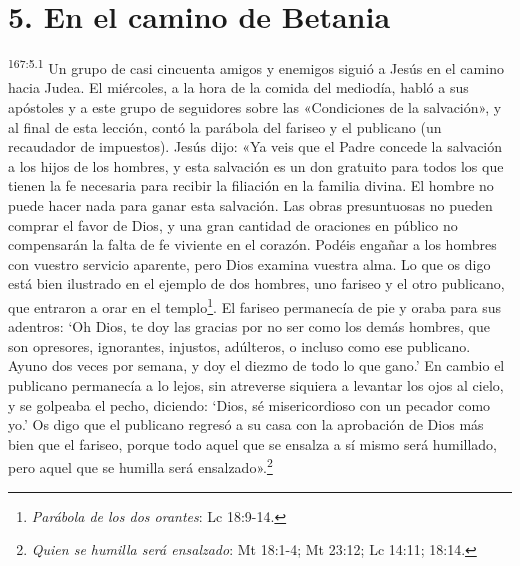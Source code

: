 \section*{5. En el camino de Betania}
\par
\textsuperscript{167:5.1} Un grupo de casi cincuenta amigos y enemigos siguió a Jesús en el camino hacia Judea. El miércoles, a la hora de la comida del mediodía, habló a sus apóstoles y a este grupo de seguidores sobre las «Condiciones de la salvación», y al final de esta lección, contó la parábola del fariseo y el publicano (un recaudador de impuestos). Jesús dijo: «Ya veis que el Padre concede la salvación a los hijos de los hombres, y esta salvación es un don gratuito para todos los que tienen la fe necesaria para recibir la filiación en la familia divina. El hombre no puede hacer nada para ganar esta salvación. Las obras presuntuosas no pueden comprar el favor de Dios, y una gran cantidad de oraciones en público no compensarán la falta de fe viviente en el corazón. Podéis engañar a los hombres con vuestro servicio aparente, pero Dios examina vuestra alma. Lo que os digo está bien ilustrado en el ejemplo de dos hombres, uno fariseo y el otro publicano, que entraron a orar en el templo\footnote{\textit{Parábola de los dos orantes}: Lc 18:9-14.}. El fariseo permanecía de pie y oraba para sus adentros: `Oh Dios, te doy las gracias por no ser como los demás hombres, que son opresores, ignorantes, injustos, adúlteros, o incluso como ese publicano. Ayuno dos veces por semana, y doy el diezmo de todo lo que gano.' En cambio el publicano permanecía a lo lejos, sin atreverse siquiera a levantar los ojos al cielo, y se golpeaba el pecho, diciendo: `Dios, sé misericordioso con un pecador como yo.' Os digo que el publicano regresó a su casa con la aprobación de Dios más bien que el fariseo, porque todo aquel que se ensalza a sí mismo será humillado, pero aquel que se humilla será ensalzado».\footnote{\textit{Quien se humilla será ensalzado}: Mt 18:1-4; Mt 23:12; Lc 14:11; 18:14.}

